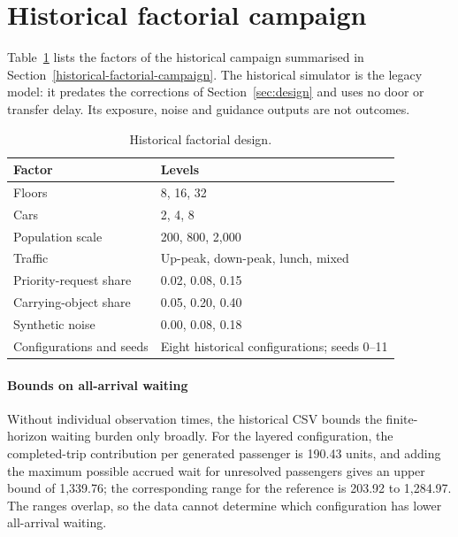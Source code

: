 \section{Historical factorial campaign}\label{app:historical}
\setcounter{table}{0}
Table~\ref{tab:historical} lists the factors of the historical campaign summarised in Section~\ref{historical-factorial-campaign}. The historical simulator is the legacy model: it predates the corrections of Section~\ref{sec:design} and uses no door or transfer delay. Its exposure, noise and guidance outputs are not outcomes.
\begin{table}[H]\centering
\caption{Historical factorial design.}\label{tab:historical}
\small\begin{tabular}{@{}p{.36\linewidth}p{.56\linewidth}@{}}
\toprule Factor & Levels\\\midrule
Floors & 8, 16, 32\\
Cars & 2, 4, 8\\
Population scale & 200, 800, 2,000\\
Traffic & Up-peak, down-peak, lunch, mixed\\
Priority-request share & 0.02, 0.08, 0.15\\
Carrying-object share & 0.05, 0.20, 0.40\\
Synthetic noise & 0.00, 0.08, 0.18\\
Configurations and seeds & Eight historical configurations; seeds 0--11\\
\bottomrule
\end{tabular}
\end{table}

\paragraph{Bounds on all-arrival waiting} Without individual observation times, the historical CSV bounds the finite-horizon waiting burden only broadly. For the layered configuration, the completed-trip contribution per generated passenger is 190.43 units, and adding the maximum possible accrued wait for unresolved passengers gives an upper bound of 1,339.76; the corresponding range for the reference is 203.92 to 1,284.97. The ranges overlap, so the data cannot determine which configuration has lower all-arrival waiting.

